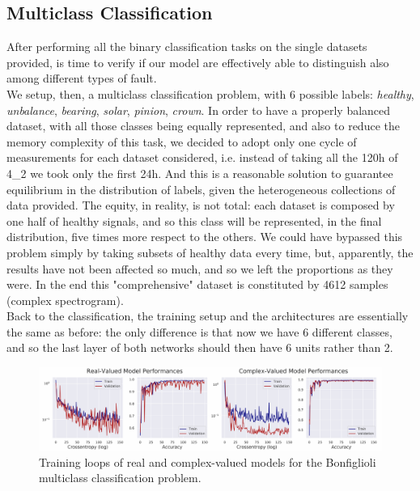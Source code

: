 \documentclass[../main.tex]{subfiles}
\begin{document}
\subsection{Multiclass Classification}

After performing all the binary classification tasks on the single datasets provided, is time to verify if our model are effectively able to distinguish also among different types of fault.\\
We setup, then, a multiclass classification problem, with 6 possible labels: \textit{healthy}, \textit{unbalance}, \textit{bearing}, \textit{solar}, \textit{pinion}, \textit{crown}. In order to have a properly balanced dataset, with all those classes being equally represented, and also to reduce the memory complexity of this task, we decided to adopt only one cycle of measurements for each dataset considered, i.e. instead of taking all the 120h of 4\_2 we took only the first 24h. And this is a reasonable solution to guarantee equilibrium in the distribution of labels, given the heterogeneous collections of data provided. The equity, in reality, is not total: each dataset is composed by one half of healthy signals, and so this class will be represented, in the final distribution, five times more respect to the others. We could have bypassed this problem simply by taking subsets of healthy data every time, but, apparently, the results have not been affected so much, and so we left the proportions as they were. In the end this "comprehensive" dataset is constituted by 4612 samples (complex spectrogram). \\
Back to the classification, the training setup and the architectures are essentially the same as before: the only difference is that now we have 6 different classes, and so the last layer of both networks should then have 6 units rather than 2.
\begin{figure}[ht]
	\centering
	\includegraphics[width=\textwidth]{pictures/bonfiglioli_onecycle_results}
	\caption{Training loops of real and complex-valued models for the Bonfiglioli multiclass classification problem.}
	\label{fig:bonfiglioli_onecycle_results}
\end{figure}
\end{document}
